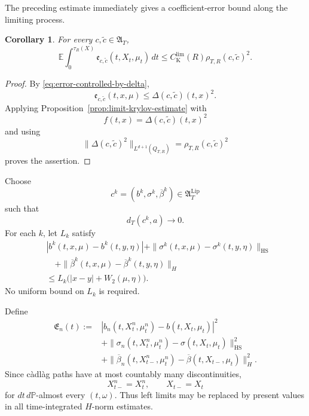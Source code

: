 \documentclass[12pt,oneside, reqno]{amsart}
\newtheorem{corollary}[theorem]{Corollary}
\numberwithin{equation}{section}
\begin{document}
	The preceding estimate immediately gives a coefficient-error bound
	along the limiting process.
	
	\begin{corollary}
		\label{cor:limit-process-coefficient-error}
		For every $c,\widetilde c\in\mathfrak A_T$,
		\begin{equation}
			\label{eq:limit-process-error-estimate}
			\mathbb E\int_0^{\tau_R(X)}
			\mathfrak e_{c,\widetilde c}
			(t,X_t,\mu_t)\,dt
			\leq
			C_{\mathrm K}^{\mathrm{lim}}(R)
			\rho_{T,R}(c,\widetilde c)^2.
		\end{equation}
	\end{corollary}
	
	\begin{proof}
		By \eqref{eq:error-controlled-by-delta},
		\[
		\mathfrak e_{c,\widetilde c}(t,x,\mu)
		\leq
		\Delta(c,\widetilde c)(t,x)^2.
		\]
		Applying Proposition~\ref{prop:limit-krylov-estimate} with
		\[
		f(t,x)=\Delta(c,\widetilde c)(t,x)^2
		\]
		and using
		\[
		\|\Delta(c,\widetilde c)^2\|_{L^{d+1}(Q_{T,R})}
		=
		\rho_{T,R}(c,\widetilde c)^2
		\]
		proves the assertion.
	\end{proof}
	
	Choose
	\begin{equation}
		\label{eq:intermediate-core-sequence}
		c^k=(b^k,\sigma^k,\overline\beta^k)
		\in\mathfrak A_T^{\mathrm{Lip}}
	\end{equation}
	such that
	\begin{equation}
		\label{eq:intermediate-core-convergence}
		d_T(c^k,a)\longrightarrow0.
	\end{equation}
	For each $k$, let $L_k$ satisfy
	\begin{equation}
		\label{eq:intermediate-core-lipschitz}
		\begin{aligned}
			&
			|b^k(t,x,\mu)-b^k(t,y,\eta)|
			+
			\|\sigma^k(t,x,\mu)-\sigma^k(t,y,\eta)\|_{\mathrm{HS}}
			\\
			&\quad+
			\|\overline\beta^k(t,x,\mu)
			-\overline\beta^k(t,y,\eta)\|_H
			\\
			&\leq
			L_k\bigl(|x-y|+W_2(\mu,\eta)\bigr).
		\end{aligned}
	\end{equation}
	No uniform bound on $L_k$ is required.
	
	Define
	\begin{align}
		\mathfrak E_n(t)
		:={}&
		|b_n(t,X_t^n,\mu_t^n)-b(t,X_t,\mu_t)|^2
		\nonumber\\
		&+
		\|\sigma_n(t,X_t^n,\mu_t^n)
		-\sigma(t,X_t,\mu_t)\|_{\mathrm{HS}}^2
		\nonumber\\
		&+
		\|\overline\beta_n(t,X_{t-}^n,\mu_t^n)
		-\overline\beta(t,X_{t-},\mu_t)\|_H^2.
		\label{eq:full-integrand-error}
	\end{align}
	Since c\`adl\`ag paths have at most countably many discontinuities,
	\[
	X_{t-}^n=X_t^n,
	\qquad
	X_{t-}=X_t
	\]
	for $dt\,d\mathbb P$-almost every $(t,\omega)$. Thus left limits may
	be replaced by present values in all time-integrated $H$-norm
	estimates.
	
\end{document}
